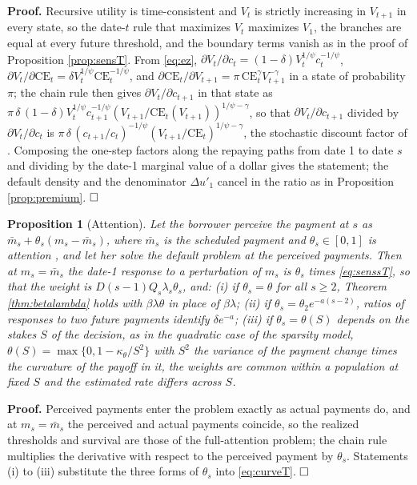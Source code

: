 \documentclass[12pt,english]{article}
\newtheorem{proposition}[theorem]{Proposition}
\begin{document}
\noindent\textbf{Proof.} Recursive utility is time-consistent and $V_t$ is strictly increasing in $V_{t+1}$ in every state, so the date-$t$ rule that maximizes $V_t$ maximizes $V_1$, the branches are equal at every future threshold, and the boundary terms vanish as in the proof of Proposition \ref{prop:sensT}. From \eqref{eq:ez}, $\partial V_t/\partial c_t = (1-\delta)V_t^{1/\psi}c_t^{-1/\psi}$, $\partial V_t/\partial\mathrm{CE}_t = \delta V_t^{1/\psi}\mathrm{CE}_t^{-1/\psi}$, and $\partial\mathrm{CE}_t/\partial V_{t+1} = \pi\,\mathrm{CE}_t^{\gamma}V_{t+1}^{-\gamma}$ in a state of probability $\pi$; the chain rule then gives $\partial V_t/\partial c_{t+1}$ in that state as $\pi\,\delta\,(1-\delta)V_t^{1/\psi}c_{t+1}^{-1/\psi}(V_{t+1}/\mathrm{CE}_t(V_{t+1}))^{1/\psi-\gamma}$, so that $\partial V_t/\partial c_{t+1}$ divided by $\partial V_t/\partial c_t$ is $\pi\,\delta\,(c_{t+1}/c_t)^{-1/\psi}(V_{t+1}/\mathrm{CE}_t)^{1/\psi-\gamma}$, the stochastic discount factor of \citet{epstein_substitution_1989}. Composing the one-step factors along the repaying paths from date 1 to date $s$ and dividing by the date-1 marginal value of a dollar gives the statement; the default density and the denominator $\Delta u'_1$ cancel in the ratio as in Proposition \ref{prop:premium}. $\hfill\square$

\begin{proposition}[Attention]\label{prop:attention}
Let the borrower perceive the payment at $s$ as $\bar m_s + \theta_s(m_s - \bar m_s)$, where $\bar m_s$ is the scheduled payment and $\theta_s \in [0,1]$ is attention \citep{gabaix_sparsity_2014}, and let her solve the default problem at the perceived payments. Then at $m_s = \bar m_s$ the date-1 response to a perturbation of $m_s$ is $\theta_s$ times \eqref{eq:senssT}, so that the weight is $D(s-1)Q_s\lambda_s\theta_s$, and: (i) if $\theta_s = \theta$ for all $s \ge 2$, Theorem \ref{thm:betalambda} holds with $\beta\lambda\theta$ in place of $\beta\lambda$; (ii) if $\theta_s = \theta_2 e^{-a(s-2)}$, ratios of responses to two future payments identify $\delta e^{-a}$; (iii) if $\theta_s = \theta(S)$ depends on the stakes $S$ of the decision, as in the quadratic case of the sparsity model, $\theta(S) = \max\{0, 1 - \kappa_\theta/S^2\}$ with $S^2$ the variance of the payment change times the curvature of the payoff in it, the weights are common within a population at fixed $S$ and the estimated rate differs across $S$.
\end{proposition}

\noindent\textbf{Proof.} Perceived payments enter the problem exactly as actual payments do, and at $m_s = \bar m_s$ the perceived and actual payments coincide, so the realized thresholds and survival are those of the full-attention problem; the chain rule multiplies the derivative with respect to the perceived payment by $\theta_s$. Statements (i) to (iii) substitute the three forms of $\theta_s$ into \eqref{eq:curveT}. $\hfill\square$
\end{document}
